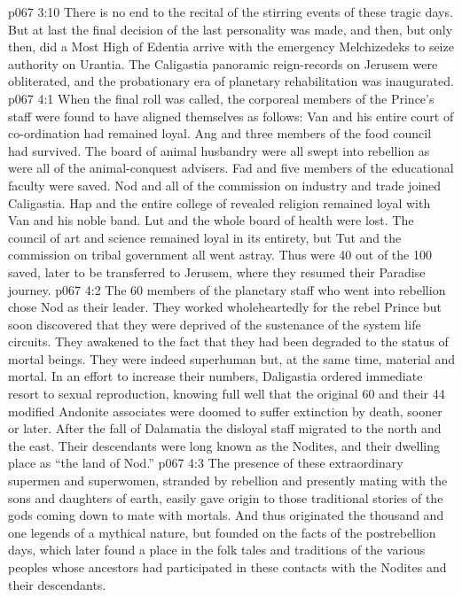\vs p067 3:10 There is no end to the recital of the stirring events of these tragic days. But at last the final decision of the last personality was made, and then, but only then, did a Most High of Edentia arrive with the emergency Melchizedeks to seize authority on Urantia. The Caligastia panoramic reign\hyp{}records on Jerusem were obliterated, and the probationary era of planetary rehabilitation was inaugurated.
\vs p067 4:1 When the final roll was called, the corporeal members of the Prince’s staff were found to have aligned themselves as follows: Van and his entire court of co\hyp{}ordination had remained loyal. Ang and three members of the food council had survived. The board of animal husbandry were all swept into rebellion as were all of the animal\hyp{}conquest advisers. Fad and five members of the educational faculty were saved. Nod and all of the commission on industry and trade joined Caligastia. Hap and the entire college of revealed religion remained loyal with Van and his noble band. Lut and the whole board of health were lost. The council of art and science remained loyal in its entirety, but Tut and the commission on tribal government all went astray. Thus were 40 out of the 100 saved, later to be transferred to Jerusem, where they resumed their Paradise journey.
\vs p067 4:2 The 60 members of the planetary staff who went into rebellion chose Nod as their leader. They worked wholeheartedly for the rebel Prince but soon discovered that they were deprived of the sustenance of the system life circuits. They awakened to the fact that they had been degraded to the status of mortal beings. They were indeed superhuman but, at the same time, material and mortal. In an effort to increase their numbers, Daligastia ordered immediate resort to sexual reproduction, knowing full well that the original 60 and their 44 modified Andonite associates were doomed to suffer extinction by death, sooner or later. After the fall of Dalamatia the disloyal staff migrated to the north and the east. Their descendants were long known as the Nodites, and their dwelling place as “the land of Nod.”
\vs p067 4:3 The presence of these extraordinary supermen and superwomen, stranded by rebellion and presently mating with the sons and daughters of earth, easily gave origin to those traditional stories of the gods coming down to mate with mortals. And thus originated the thousand and one legends of a mythical nature, but founded on the facts of the postrebellion days, which later found a place in the folk tales and traditions of the various peoples whose ancestors had participated in these contacts with the Nodites and their descendants.
